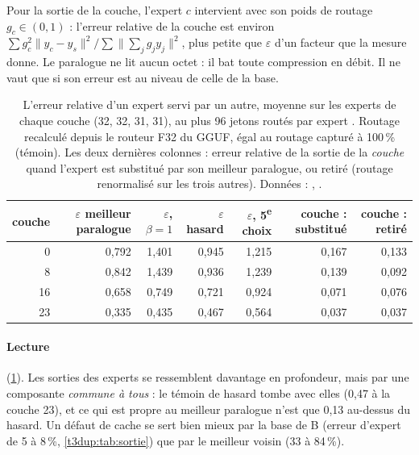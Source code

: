Pour la sortie de la couche, l'expert $c$ intervient avec son poids de routage $g_c \in (0, 1)$ : l'erreur relative de la couche est environ $\sum g_c^2\|y_c - y_s\|^2 / \sum\|\sum_j g_j y_j\|^2$, plus petite que $\varepsilon$ d'un facteur que la mesure donne. Le paralogue ne lit aucun octet : il bat toute compression en débit. Il ne vaut que si son erreur est au niveau de celle de la base.

\begin{table}[tbp]
\centering\small
\begin{tabular}{r r r r r r r}
\toprule
couche & $\varepsilon$ meilleur paralogue & $\varepsilon$, $\beta = 1$ & $\varepsilon$ hasard & $\varepsilon$, 5\textsuperscript{e} choix & couche : substitué & couche : retiré \\
\midrule
0 & 0,792 & 1,401 & 0,945 & 1,215 & 0,167 & 0,133 \\
8 & 0,842 & 1,439 & 0,936 & 1,239 & 0,139 & 0,092 \\
16 & 0,658 & 0,749 & 0,721 & 0,924 & 0,071 & 0,076 \\
23 & 0,335 & 0,435 & 0,467 & 0,564 & 0,037 & 0,037 \\
\bottomrule
\end{tabular}
\caption[Les paralogues, par profondeur]{L'erreur relative d'un expert servi par un autre, moyenne sur les experts de chaque couche (32, 32, 31, 31), au plus 96 jetons routés par expert \mes. Routage recalculé depuis le routeur F32 du GGUF, égal au routage capturé à 100\,\% (témoin). Les deux dernières colonnes : erreur relative de la sortie de la \emph{couche} quand l'expert est substitué par son meilleur paralogue, ou retiré (routage renormalisé sur les trois autres). Données : , .}
\label{t3dup:tab:paralogues}
\end{table}

\paragraph{Lecture} (\cref{t3dup:tab:paralogues}). Les sorties des experts se ressemblent davantage en profondeur, mais par une composante \emph{commune à tous} : le témoin de hasard tombe avec elles (0,47 à la couche 23), et ce qui est propre au meilleur paralogue n'est que 0,13 au-dessus du hasard. Un défaut de cache se sert bien mieux par la base de B (erreur d'expert de 5 à 8\,\%, \cref{t3dup:tab:sortie}) que par le meilleur voisin (33 à 84\,\%).

